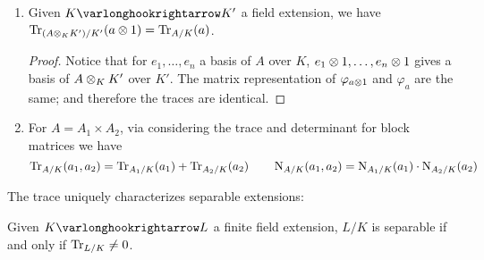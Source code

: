 \begin{remark}
\begin{enumerate}[label=\arabic*)]
\begin{proof}
            Write out the basis for the corresponding algebras. Choose $e_1, \dots, e_m$ a basis for $K$ as a $k$-vector space, and $f_1, \dots, f_n$ a basis for $A$ as a $K$-vector space. Then $(e_i f_r)$ for $1 \leq i \leq n$, $1 \leq r \leq m$ gives a basis of $A$ as a $k$-vector space. Fix $a \in A$, define $(c_{ij}) \in K$ and $(\gamma_{ijrs}) \in k$ as 
            \[
                a f_j = \sum_{i = 1}^n c_{ij} f_i, \qquad c_{ij} e_s = \sum_{r = 1}^m \gamma_{ijrs} e_r
            \]
            Verify the equality of both sides:
            \[
                \mathrm{RHS} = \Tr_{K/k} \circ \Tr_{A/K}(a) = \sum_{i = 1}^n \Tr_{K/k} (c_{ii}) = \sum_{i = 1}^n \sum_{r = 1}^m \gamma_{iirr}
            \]
            while $\varphi_a$ in the basis for $A$ over $k$ can be expressed as
            \[
                a f_j e_s = \sum_{i = 1}^n c_{ij} f_i e_s = \sum_{i = 1}^n \sum_{r = 1}^m \gamma_{ijrs} f_i e_r \quad \implies \quad \mathrm{LHS} = \Tr_{A/K}(a) = \sum_{i = 1}^n \sum_{r = 1}^m \gamma_{iirr}
            \]
        \end{proof}
        \item Given $K \ext K'$ a field extension, we have $\operatorname{Tr}_{(A \otimes_K K')/K'}(a \otimes 1) = \operatorname{Tr}_{A/K}(a)$.
        \begin{proof}
            Notice that for $e_1, \dots, e_n$ a basis of $A$ over $K$, $e_1 \otimes 1, \dots, e_n \otimes 1$ gives a basis of $A \otimes_K K'$ over $K'$. The matrix representation of $\varphi_{a \otimes 1}$ and $\varphi_a$ are the same; and therefore the traces are identical.
        \end{proof}
        \item For $A = A_1 \times A_2$, via considering the trace and determinant for block matrices we have
        \[
            \operatorname{Tr}_{A/K}(a_1, a_2) = \operatorname{Tr}_{A_1/K}(a_1) + \operatorname{Tr}_{A_2/K}(a_2) \qquad \operatorname{N}_{A/K}(a_1, a_2) = \operatorname{N}_{A_1/K}(a_1) \cdot \operatorname{N}_{A_2/K}(a_2)
        \]
    \end{enumerate}
\end{remark}

\textstart
The trace uniquely characterizes separable extensions:

\begin{theorem}\label{thm: ext separable iff trace nonzero}
    Given $K \ext L$ a finite field extension, $L/K$ is separable if and only if $\operatorname{Tr}_{L/K} \neq 0$.
\end{theorem}

